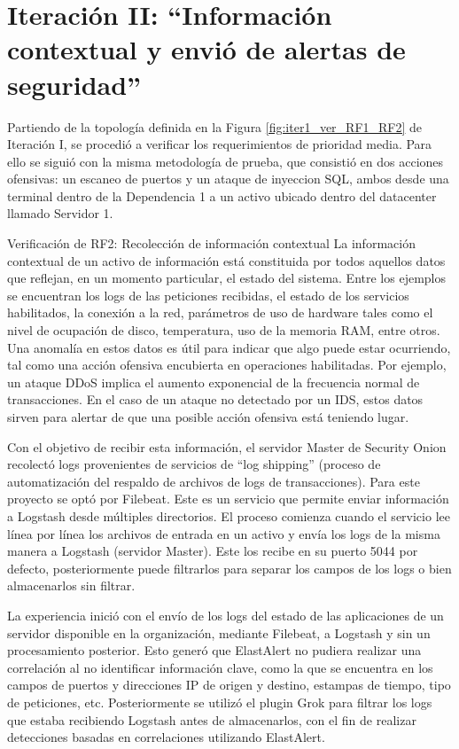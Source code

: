 \chapter{\Large Iteración II: “Información contextual y envió de alertas de seguridad”}
\label{iteracion2}
    Partiendo de la topología definida en la Figura \ref{fig:iter1_ver_RF1_RF2} de Iteración I, se procedió a verificar los requerimientos de prioridad media. Para ello se siguió con la misma metodología de prueba, que consistió en dos acciones ofensivas: un escaneo de puertos y un ataque de inyeccion SQL, ambos desde una terminal dentro de la Dependencia 1 a un activo ubicado dentro del datacenter llamado Servidor 1.
    \begin{section}{Verificación de RF2: Recolección de información contextual}
    La información contextual de un activo de información está constituida por todos aquellos datos que reflejan, en un momento particular, el estado del sistema. Entre los ejemplos se encuentran los logs de las peticiones recibidas, el estado de los servicios habilitados, la conexión a la red, parámetros de uso de hardware tales como el nivel de ocupación de disco, temperatura, uso de la memoria RAM, entre otros. Una anomalía en estos datos es útil para indicar que algo puede estar ocurriendo, tal como una acción ofensiva encubierta en operaciones habilitadas. Por ejemplo, un ataque DDoS implica el aumento exponencial de la frecuencia normal de transacciones. En el caso de un ataque no detectado por un IDS, estos datos sirven para alertar de que una posible acción ofensiva está teniendo lugar. \par
    Con el objetivo de recibir esta información, el servidor Master de Security Onion recolectó logs provenientes de servicios de “log shipping” (proceso de automatización del respaldo de archivos de logs de transacciones). Para este proyecto se optó por Filebeat. Este es un servicio que permite enviar información a Logstash desde múltiples directorios. El proceso comienza cuando el servicio lee línea por línea los archivos de entrada en un activo y envía los logs de la misma manera a Logstash (servidor Master). Este los recibe en su puerto 5044 por defecto, posteriormente puede filtrarlos para separar los campos de los logs o bien almacenarlos sin filtrar. \par
    La experiencia inició con el envío de los logs del estado de las aplicaciones de un servidor disponible en la organización, mediante Filebeat, a Logstash y sin un procesamiento posterior. Esto generó que ElastAlert no pudiera realizar una correlación al no identificar información clave, como la que se encuentra en los campos de puertos y direcciones IP de origen y destino, estampas de tiempo, tipo de peticiones, etc. Posteriormente se utilizó el plugin Grok \cite{grok} para filtrar los logs que estaba recibiendo Logstash antes de almacenarlos, con el fin de realizar detecciones basadas en correlaciones utilizando ElastAlert.\par

\end{section}
